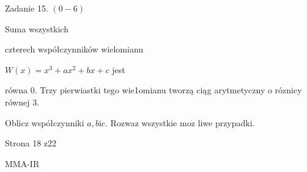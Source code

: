 \documentclass[a4paper,12pt]{article}
\begin{document}
Zadanie 15. $(0-6)$

Suma wszystkich

czterech współczynników wielomianu

$W(x)=x^{3}+ax^{2}+bx+c$ jest

równa 0. Trzy pierwiastki tego wie1omianu tworzą ciąg arytmetyczny o róznicy równej 3.

Oblicz współczynniki $a, b \mathrm{i}c$. Rozwaz wszystkie $\mathrm{m}\mathrm{o}\dot{\mathrm{z}}$ liwe przypadki.

Strona 18 z22

MMA-IR
\end{document}
